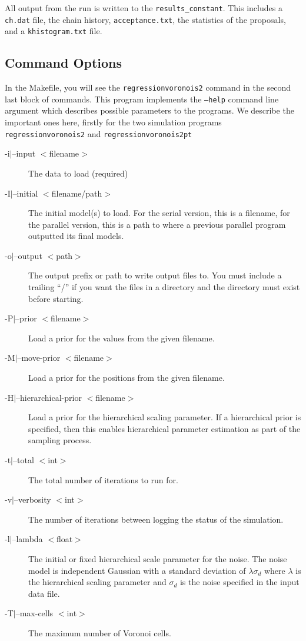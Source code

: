 \documentclass{article}
\begin{document}
All output from the run is written to the {\tt results\_constant}. This
includes a {\tt ch.dat} file, the chain history, {\tt acceptance.txt}, the statistics
of the proposals, and a {\tt khistogram.txt} file.

\subsection{Command Options}

In the Makefile, you will see the {\tt regressionvoronois2} command in the second
last block of commands. This program implements the {\tt --help} command line argument
which describes possible parameters to the programs. We describe the
important ones here, firstly for the two simulation programs {\tt regressionvoronois2}
and {\tt regressionvoronois2pt}

\begin{description}
\item [-i$|$--input $<$filename$>$] The data to load (required)
\item [-I$|$--initial $<$filename/path$>$] The initial model(s) to load. For the serial version,
  this is a filename, for the parallel version, this is a path to where a previous parallel
  program outputted its final models.
\item [-o$|$--output $<$path$>$] The output prefix or path to write output files to. You must include
  a trailing ``/'' if you want the files in a directory and the directory must exist before starting.
\item [-P$|$--prior $<$filename$>$] Load a prior for the values from the given filename.
\item [-M$|$--move-prior $<$filename$>$] Load a prior for the positions from the given filename.
\item [-H$|$--hierarchical-prior $<$filename$>$] Load a prior for the hierarchical scaling parameter. If a
  hierarchical prior is specified, then this enables hierarchical parameter estimation as part of the
  sampling process.
\item [-t$|$--total $<$int$>$] The total number of iterations to run for.
\item [-v$|$--verbosity $<$int$>$] The number of iterations between logging the status of the simulation.
\item [-l$|$--lambda $<$float$>$] The initial or fixed hierarchical scale parameter for the noise. The noise
  model is independent Gaussian with a standard deviation of $\lambda \sigma_d$ where $\lambda$ is
  the hierarchical scaling parameter and $\sigma_d$ is the noise specified in the input data file.
\item [-T$|$--max-cells $<$int$>$] The maximum number of Voronoi cells.
\end{description}
\end{document}
